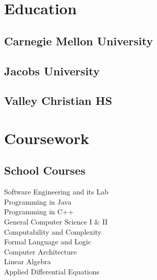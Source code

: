 \documentclass[]{deedy-resume-openfont}
\begin{document}
%
%
\lastupdated

%
%



%
%

\begin{minipage}[t]{0.33\textwidth} 


\section{Education} 
\subsection{\normalsize{Carnegie Mellon University}}
\sectionsep

\subsection{Jacobs University}
\sectionsep

\subsection{Valley Christian HS}
\sectionsep


\section{Coursework}

\subsection{School Courses}
Software Engineering and its Lab \\
Programming in Java \\
Programming in C++ \\
General Computer Science I \& II \\
Computability and Complexity \\
Formal Language and Logic \\
Computer Architecture \\ 
Linear Algebra \\
Applied Differential Equations \\ 


\end{minipage}
\end{document}
